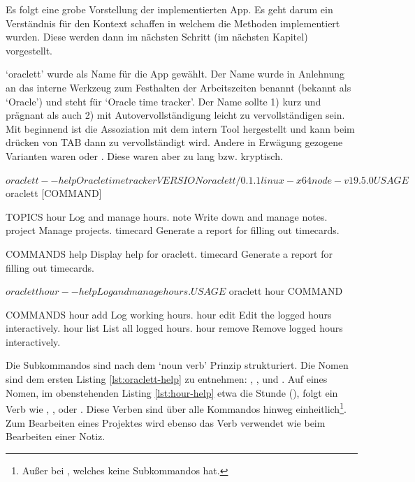 \documentclass[oneside,bibliography=totocnumbered,BCOR=5mm]{scrbook}
\newenvironment{code}{\captionsetup{type=listing, skip=0pt}}{}
\begin{document}
Es folgt eine grobe Vorstellung der implementierten App. Es geht darum ein
Verständnis für den Kontext schaffen in welchem die Methoden implementiert
wurden. Diese werden dann im nächsten Schritt (im nächsten Kapitel) vorgestellt.

`oraclett' wurde als Name für die App gewählt. Der Name wurde in Anlehnung
an das interne Werkzeug zum Festhalten der Arbeitszeiten benannt (bekannt
als `Oracle') und steht für `Oracle time tracker'. Der Name sollte
1) kurz und prägnant als auch 2) mit Autovervollständigung leicht zu
vervollständigen sein. Mit  beginnend ist die Assoziation
mit dem intern Tool hergestellt und kann beim drücken von TAB dann zu
 vervollständigt wird. Andere in Erwägung gezogene
Varianten waren  oder . Diese
waren aber zu lang bzw. kryptisch.

\begin{code}
  \begin{shellcode}
$ oraclett --help
Oracle time tracker

VERSION
  oraclett/0.1.1 linux-x64 node-v19.5.0

USAGE
  $ oraclett [COMMAND]

TOPICS
  hour      Log and manage hours.
  note      Write down and manage notes.
  project   Manage projects.
  timecard  Generate a report for filling out timecards.

COMMANDS
  help      Display help for oraclett.
  timecard  Generate a report for filling out timecards.
  \end{shellcode}
  \label{lst:oraclett-help}
  \medskip
\end{code}

\begin{code}
  \begin{shellcode}
$ oraclett hour --help
Log and manage hours.

USAGE
  $ oraclett hour COMMAND

COMMANDS
  hour add     Log working hours.
  hour edit    Edit the logged hours interactively.
  hour list    List all logged hours.
  hour remove  Remove logged hours interactively.
  \end{shellcode}
  \label{lst:hour-help}
  \medskip
\end{code}

\label{text:noun-verb} Die Subkommandos sind nach dem `noun verb'
Prinzip \parencite{clig} strukturiert. Die Nomen sind dem ersten Listing
\ref{lst:oraclett-help} zu entnehmen: , ,
 und . Auf eines Nomen, im
obenstehenden Listing \ref{lst:hour-help} etwa die Stunde (),
folgt ein Verb wie , , 
oder . Diese Verben sind über alle Kommandos hinweg
einheitlich\footnote{Außer bei , welches keine
Subkommandos hat.}. Zum Bearbeiten eines Projektes wird ebenso das Verb
 verwendet wie beim Bearbeiten einer Notiz.
\end{document}
